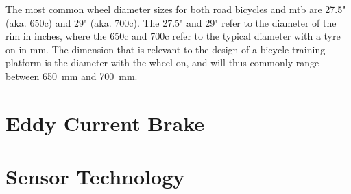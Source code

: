 The most common wheel diameter sizes for both road bicycles and \ac{mtb} are 27.5" (aka. 650c) and 29" (aka. 700c). The 27.5" and 29" refer to the diameter of the rim in inches, where the 650c and 700c refer to the typical diameter with a tyre on in \si{\milli\meter}. The dimension that is relevant to the design of a bicycle training platform is the diameter with the wheel on, and will thus commonly range between \SI{650}{\milli\meter} and \SI{700}{\milli\meter}. \citep{Montague:2019}

\newpage

\section{Eddy Current Brake}

\newpage

\section{Sensor Technology}

\newpage

